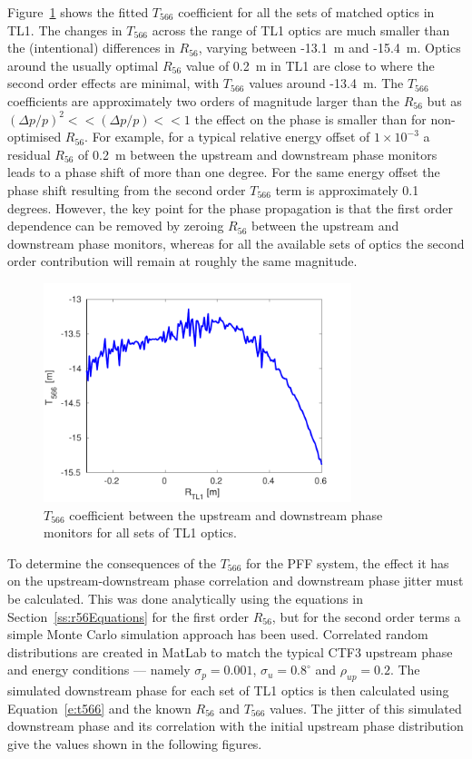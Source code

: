 Figure~\ref{f:t566TotVsr56TL1} shows the fitted \(T_{566}\) coefficient for all the sets of matched optics in TL1. The changes in \(T_{566}\) across the range of TL1 optics are much smaller than the (intentional) differences in \(R_{56}\), varying between -13.1~m and -15.4~m. Optics around the usually optimal \(R_{56}\) value of 0.2~m in TL1  are close to where the second order effects are minimal, with \(T_{566}\) values around -13.4~m. The \(T_{566}\) coefficients are approximately two orders of magnitude larger than the \(R_{56}\) but as \(\left(\Delta p / p\right)^2 << \left(\Delta p / p\right) << 1\) the effect on the phase is smaller than for non-optimised \(R_{56}\). For example, for a typical relative energy offset of \(1 \times 10^{-3}\) a residual \(R_{56}\) of 0.2~m between the upstream and downstream phase monitors leads to a phase shift of more than one degree. For the same energy offset the phase shift resulting from the second order \(T_{566}\) term is approximately 0.1 degrees. However, the key point for the phase propagation is that the first order dependence can be removed by zeroing \(R_{56}\) between the upstream and downstream phase monitors, whereas for all the available sets of optics the second order contribution will remain at roughly the same magnitude.

\begin{figure}
  \centering
  \includegraphics[width=0.8\textwidth]{Figures/propagation/t566TotVsr56TL1}
  \caption{\(T_{566}\) coefficient between the upstream and downstream phase monitors for all sets of TL1 optics.}
  \label{f:t566TotVsr56TL1}
\end{figure}

To determine the consequences of the \(T_{566}\) for the PFF system, the effect it has on the upstream-downstream phase correlation and downstream phase jitter must be calculated. This was done analytically using the equations in Section~\ref{ss:r56Equations} for the first order \(R_{56}\), but for the second order terms a simple Monte Carlo simulation approach has been used. Correlated random distributions are created in MatLab to match the typical CTF3 upstream phase and energy conditions --- namely \(\sigma_p = 0.001\), \(\sigma_u = 0.8^\circ\) and \(\rho_{up} = 0.2\). The simulated downstream phase for each set of TL1 optics is then calculated using Equation~\ref{e:t566} and the known \(R_{56}\) and \(T_{566}\) values. The jitter of this simulated downstream phase and its correlation with the initial upstream phase distribution give the values shown in the following figures.

